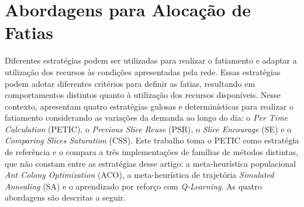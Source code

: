 \section{Abordagens para Alocação de Fatias}

Diferentes estratégias podem ser utilizadas para realizar o fatiamento e adaptar a utilização dos recursos às condições apresentadas pela rede. Essas estratégias podem adotar diferentes critérios para definir as fatias, resultando em comportamentos distintos quanto à utilização dos recursos disponíveis. Nesse contexto,  apresentam quatro estratégias gulosas e determinísticas para realizar o fatiamento considerando as variações da demanda ao longo do dia: o \textit{Per Time Calculation} (PETIC), o \textit{Previous Slice Reuse} (PSR), o \textit{Slice Encourage} (SE) e o \textit{Comparing Slices Saturation} (CSS). Este trabalho toma o PETIC como estratégia de referência e o compara a três implementações de famílias de métodos distintas, que não constam entre as estratégias desse artigo: a meta-heurística populacional \textit{Ant Colony Optimization} (ACO), a meta-heurística de trajetória \textit{Simulated Annealing} (SA) e o aprendizado por reforço com \textit{Q-Learning}. As quatro abordagens são descritas a seguir.







